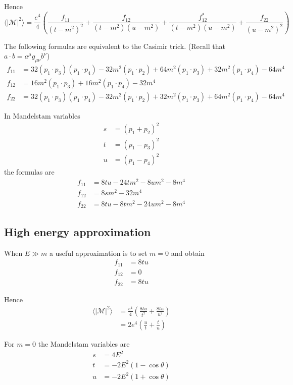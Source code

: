 \documentclass[12pt]{article}
\begin{document}
\noindent
Hence
\begin{equation*}
\langle|\mathcal{M}|^2\rangle
=
\frac{e^4}{4}
\left(
\frac{f_{11}}{(t-m^2)^2}
+\frac{f_{12}}{(t-m^2)(u-m^2)}
+\frac{f_{12}^*}{(t-m^2)(u-m^2)}
+\frac{f_{22}}{(u-m^2)^2}
\right)
\end{equation*}

\noindent
The following formulas are equivalent to the Casimir trick.
(Recall that $a\cdot b=a^\mu g_{\mu\nu}b^\nu$)
\begin{align*}
f_{11}&=
 32 (p_1 \cdot p_3) (p_1 \cdot p_4) -
 32 m^2 (p_1 \cdot p_2) +
 64 m^2 (p_1 \cdot p_3) +
 32 m^2 (p_1 \cdot p_4) - 64 m^4
\\
f_{12}&=
 16 m^2 (p_1 \cdot p_3) +
 16 m^2 (p_1 \cdot p_4) - 32 m^4
\\
f_{22}&=
 32 (p_1 \cdot p_3) (p_1 \cdot p_4) -
 32 m^2 (p_1 \cdot p_2) +
 32 m^2 (p_1 \cdot p_3) +
 64 m^2 (p_1 \cdot p_4) - 64 m^4
\end{align*}

\noindent
In Mandelstam variables
\begin{align*}
s&=(p_1+p_2)^2
\\
t&=(p_1-p_3)^2
\\
u&=(p_1-p_4)^2
\end{align*}
the formulas are
\begin{align*}
f_{11}&=8 t u - 24 t m^2 - 8 u m^2 - 8 m^4
\\
f_{12}&=8 s m^2 - 32 m^4
\\
f_{22}&=8 t u - 8 t m^2 - 24 u m^2 - 8 m^4
\end{align*}

\subsection*{High energy approximation}
When $E\gg m$ a useful approximation is to set $m=0$ and obtain
\begin{align*}
f_{11}&=8tu
\\
f_{12}&=0
\\
f_{22}&=8tu
\end{align*}

\noindent
Hence
\begin{align*}
\langle|\mathcal{M}|^2\rangle
&=
\frac{e^4}{4}
\left(
\frac{8tu}{t^2}
+\frac{8tu}{u^2}
\right)
\\
&=
2e^4
\left(
\frac{u}{t}
+\frac{t}{u}
\right)
\end{align*}

\noindent
For $m=0$ the Mandelstam variables are
\begin{align*}
s&=4E^2\\
t&=-2E^2(1-\cos\theta)
\\
u&=-2E^2(1+\cos\theta)
\end{align*}
\end{document}
